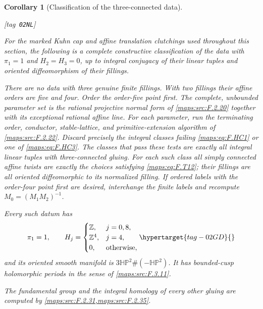 \documentclass[11pt,a4paper]{article}
\numberwithin{equation}{section}
\newtheorem{corollary}[corollary]{Corollary}
\theoremstyle{definition}
\newcommand{\StatementRecord}[4]{{\upshape\footnotesize[tag~\texttt{#3}]}\enspace\ignorespaces}
\begin{document}
\begin{corollary}[Classification of the three-connected data]\hypertarget{tag-02NL}{}\label{maps:src:F.2.30}
\StatementRecord{maps:src:F.2.30}{proved}{02NL}{\cref{maps:src:F.2.20}, \cref{maps:src:F.2.22}, \eqref{maps:eq:F.HC1}, \eqref{maps:eq:F.HC3}, \eqref{maps:eq:F.T12}, \cref{maps:src:F.3.11}, \cref{maps:src:F.2.7}, \cref{maps:src:F.2.14}, \cref{maps:src:F.2.25}, \cref{maps:src:F.2.27}, \cref{maps:src:F.2.28}, \cref{maps:src:F.2.29}, \cref{maps:src:E.1.3}, \cref{maps:src:F.2.15}, \cref{pub:V:smooth-gluing}, \cref{sec:V-known-inputs}, \cref{maps:src:F.4.1}}


For the marked Kuhn cap and affine translation clutchings
used throughout this section, the following is a complete constructive
classification of the data with
$\pi_1=1$ and $H_2=H_3=0$, up to integral conjugacy of their
linear tuples and oriented diffeomorphism of their fillings.

There are no data with three genuine finite fillings.
With two fillings their affine orders are five and
four.  Order the order-five point first.
The complete, unbounded parameter set is the rational
projective normal form of \ref{maps:src:F.2.20} together with its
exceptional rational affine line.
For each parameter, run the terminating order,
conductor, stable-lattice, and primitive-extension algorithm
of \ref{maps:src:F.2.22}.  Discard precisely the integral classes failing
\eqref{maps:eq:F.HC1} or one of \eqref{maps:eq:F.HC3}.
The classes that pass these tests are exactly all
integral linear tuples with three-connected gluing.
For each such class all simply connected affine
twists are exactly the choices satisfying \eqref{maps:eq:F.T12};
their fillings are all oriented diffeomorphic to its
normalized filling.
If ordered labels with the order-four point first are
desired, interchange the finite labels and recompute
$M_0=(M_1M_2)^{-1}$.

Every such datum has
\begin{equation}
 \pi_1=1,\qquad
 H_j=\begin{cases}
  \mathbb Z,&j=0,8,\\
  \mathbb Z^4,&j=4,\\
  0,&\text{otherwise},
 \end{cases}
 \hypertarget{tag-02GD}{}\label{maps:eq:F.HC13}
\end{equation}
and its oriented smooth manifold is
$3\mathbb{HP}^2\#(-\mathbb{HP}^2)$.
It has bounded-cusp holomorphic periods in the sense of \ref{maps:src:F.3.11}.

The fundamental group and the integral homology of every other gluing are computed by \cref{maps:src:F.2.31,maps:src:F.2.35}.

\end{corollary}
\end{document}
